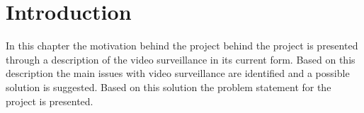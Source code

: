 \chapter{Introduction}
In this chapter the motivation behind the project behind the project is presented through a description of the video surveillance in its current form.
Based on this description the main issues with video surveillance are identified and a possible solution is suggested.
Based on this solution the problem statement for the project is presented.




%
